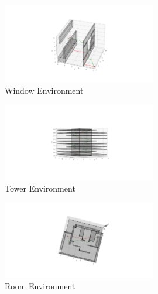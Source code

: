 \documentclass[conference]{IEEEtran}
\begin{document}
\begin{figure}[H]
    \centering
    \includegraphics[width=0.6\textwidth]{window_astar.png}
    \caption{Window Environment}
    \label{fig:window_astar}
\end{figure}
\begin{figure}[H]
    \centering
    \includegraphics[width=0.6\textwidth]{tower_astar.png}
    \caption{Tower Environment}
    \label{fig:tower_astar}
\end{figure}
\begin{figure}[H]
    \centering
    \includegraphics[width=0.6\textwidth]{room_astar.png}
    \caption{Room Environment}
    \label{fig:room_astar}
\end{figure}
\end{document}
